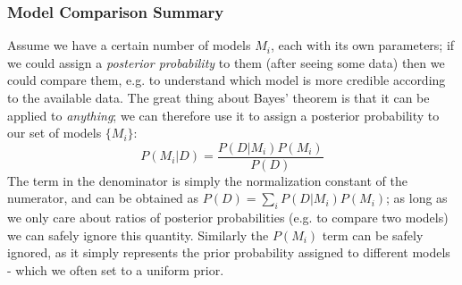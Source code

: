 \subsubsection{Model Comparison Summary}
Assume we have a certain number of models $M_i$, each with its own parameters; if we could assign a \emph{posterior probability} to them (after seeing some data) then we could compare them, e.g. to understand which model is more credible according to the available data.
The great thing about Bayes' theorem is that it can be applied to \emph{anything}; we can therefore use it to assign a posterior probability to our set of models $\{M_i\}$:
\begin{equation*}
    P(M_i|D) = \frac{P(D|M_i) P(M_i)}{P(D)}
\end{equation*}
The term in the denominator is simply the normalization constant of the numerator, and can be obtained as $P(D) = \sum_i P(D|M_i) P(M_i)$; as long as we only care about ratios of posterior probabilities (e.g. to compare two models) we can safely ignore this quantity. Similarly the $P(M_i)$ term can be safely ignored, as it simply represents the prior probability assigned to different models - which we often set to a uniform prior.


